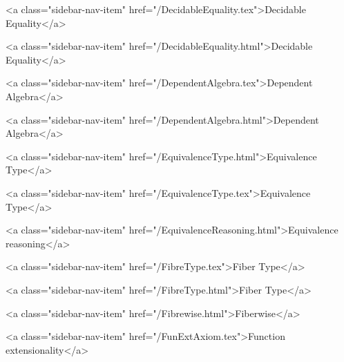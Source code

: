       
    
      
        
          <a class="sidebar-nav-item" href="/DecidableEquality.tex">Decidable Equality</a>
        
      
    
      
        
          <a class="sidebar-nav-item" href="/DecidableEquality.html">Decidable Equality</a>
        
      
    
      
        
          <a class="sidebar-nav-item" href="/DependentAlgebra.tex">Dependent Algebra</a>
        
      
    
      
        
          <a class="sidebar-nav-item" href="/DependentAlgebra.html">Dependent Algebra</a>
        
      
    
      
        
          <a class="sidebar-nav-item" href="/EquivalenceType.html">Equivalence Type</a>
        
      
    
      
        
          <a class="sidebar-nav-item" href="/EquivalenceType.tex">Equivalence Type</a>
        
      
    
      
        
          <a class="sidebar-nav-item" href="/EquivalenceReasoning.html">Equivalence reasoning</a>
        
      
    
      
        
          <a class="sidebar-nav-item" href="/FibreType.tex">Fiber Type</a>
        
      
    
      
        
          <a class="sidebar-nav-item" href="/FibreType.html">Fiber Type</a>
        
      
    
      
        
          <a class="sidebar-nav-item" href="/Fibrewise.html">Fiberwise</a>
        
      
    
      
        
          <a class="sidebar-nav-item" href="/FunExtAxiom.tex">Function extensionality</a>
        
